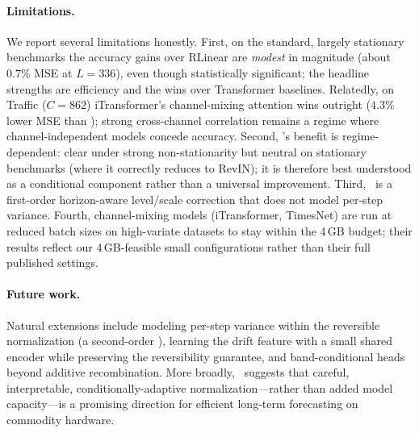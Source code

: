 \paragraph{Limitations.}
We report several limitations honestly. First, on the standard, largely
stationary benchmarks the accuracy gains over RLinear are \emph{modest} in
magnitude (about $0.7\%$ MSE at $L{=}336$), even though statistically significant;
the headline strengths are efficiency and the wins over Transformer baselines.
Relatedly, on Traffic ($C{=}862$) iTransformer's channel-mixing attention wins
outright ($4.3\%$ lower MSE than \method); strong cross-channel correlation
remains a regime where channel-independent models concede accuracy.
Second, \arevin's benefit is regime-dependent: clear under strong non-stationarity
but neutral on stationary benchmarks (where it correctly reduces to RevIN); it is
therefore best understood as a conditional component rather than a universal
improvement. Third, \arevin\ is a first-order horizon-aware level/scale
correction that does not model per-step variance. Fourth, channel-mixing models
(iTransformer, TimesNet) are run at reduced batch sizes on high-variate datasets
to stay within the 4\,GB budget; their results reflect our 4\,GB-feasible
small configurations rather than their full published settings.

\paragraph{Future work.}
Natural extensions include modeling per-step variance within the reversible
normalization (a second-order \arevin), learning the drift feature with a small
shared encoder while preserving the reversibility guarantee, and band-conditional
heads beyond additive recombination. More broadly, \method\ suggests that careful,
interpretable, conditionally-adaptive normalization---rather than added model
capacity---is a promising direction for efficient long-term forecasting on
commodity hardware.
